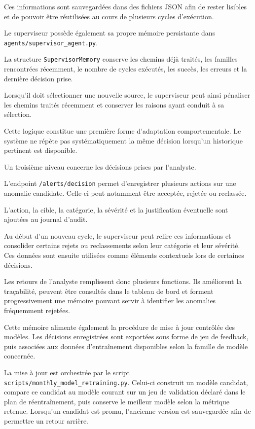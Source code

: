 Ces informations sont sauvegardées dans des fichiers JSON afin de rester lisibles et de pouvoir être réutilisées au cours de plusieurs cycles d'exécution.

Le superviseur possède également sa propre mémoire persistante dans \texttt{agents/supervisor\_agent.py}.

La structure \texttt{SupervisorMemory} conserve les chemins déjà traités, les familles rencontrées récemment, le nombre de cycles exécutés, les succès, les erreurs et la dernière décision prise.

Lorsqu'il doit sélectionner une nouvelle source, le superviseur peut ainsi pénaliser les chemins traités récemment et conserver les raisons ayant conduit à sa sélection.

Cette logique constitue une première forme d'adaptation comportementale. Le système ne répète pas systématiquement la même décision lorsqu'un historique pertinent est disponible.

Un troisième niveau concerne les décisions prises par l'analyste.

L'endpoint \texttt{/alerts/decision} permet d'enregistrer plusieurs actions sur une anomalie candidate. Celle-ci peut notamment être acceptée, rejetée ou reclassée.

L'action, la cible, la catégorie, la sévérité et la justification éventuelle sont ajoutées au journal d'audit.

Au début d'un nouveau cycle, le superviseur peut relire ces informations et consolider certains rejets ou reclassements selon leur catégorie et leur sévérité. Ces données sont ensuite utilisées comme éléments contextuels lors de certaines décisions.

Les retours de l'analyste remplissent donc plusieurs fonctions. Ils améliorent la traçabilité, peuvent être consultés dans le tableau de bord et forment progressivement une mémoire pouvant servir à identifier les anomalies fréquemment rejetées.

Cette mémoire alimente également la procédure de mise à jour contrôlée des modèles. Les décisions enregistrées sont exportées sous forme de jeu de feedback, puis associées aux données d'entraînement disponibles selon la famille de modèle concernée.

La mise à jour est orchestrée par le script \texttt{scripts/monthly\_model\_retraining.py}. Celui-ci construit un modèle candidat, compare ce candidat au modèle courant sur un jeu de validation déclaré dans le plan de réentraînement, puis conserve le meilleur modèle selon la métrique retenue. Lorsqu'un candidat est promu, l'ancienne version est sauvegardée afin de permettre un retour arrière.

